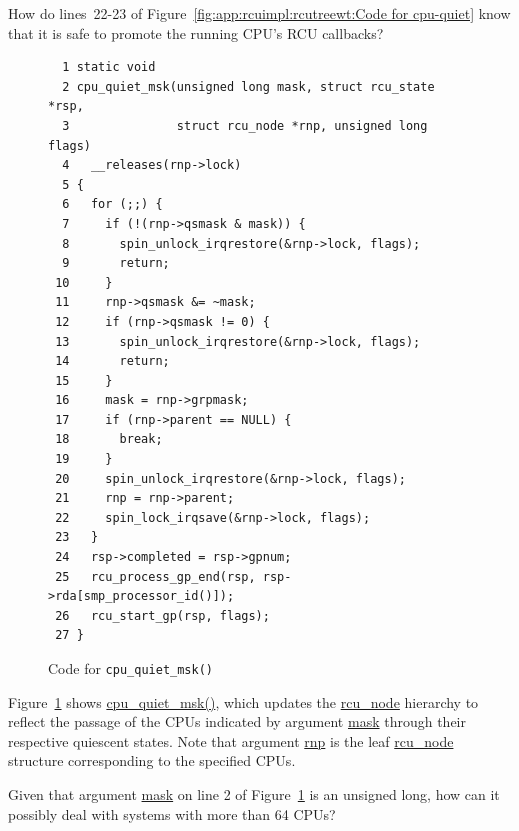\QuickQuiz{}
	How do lines~22-23 of
	Figure~\ref{fig:app:rcuimpl:rcutreewt:Code for cpu-quiet}
	know that it is safe to promote the running CPU's RCU
	callbacks?
 \QuickQuizEnd

\begin{figure}[tbp]
{ \scriptsize
\begin{verbatim}
  1 static void
  2 cpu_quiet_msk(unsigned long mask, struct rcu_state *rsp,
  3               struct rcu_node *rnp, unsigned long flags)
  4   __releases(rnp->lock)
  5 {
  6   for (;;) {
  7     if (!(rnp->qsmask & mask)) {
  8       spin_unlock_irqrestore(&rnp->lock, flags);
  9       return;
 10     }
 11     rnp->qsmask &= ~mask;
 12     if (rnp->qsmask != 0) {
 13       spin_unlock_irqrestore(&rnp->lock, flags);
 14       return;
 15     }
 16     mask = rnp->grpmask;
 17     if (rnp->parent == NULL) {
 18       break;
 19     }
 20     spin_unlock_irqrestore(&rnp->lock, flags);
 21     rnp = rnp->parent;
 22     spin_lock_irqsave(&rnp->lock, flags);
 23   }
 24   rsp->completed = rsp->gpnum;
 25   rcu_process_gp_end(rsp, rsp->rda[smp_processor_id()]);
 26   rcu_start_gp(rsp, flags);
 27 }
\end{verbatim}
}
\caption{Code for {\tt cpu\_quiet\_msk()}}
\label{fig:app:rcuimpl:rcutreewt:Code for cpu-quiet-msk}
\end{figure}

Figure~\ref{fig:app:rcuimpl:rcutreewt:Code for cpu-quiet-msk}
shows \url{cpu_quiet_msk()}, which updates the \url{rcu_node}
hierarchy to reflect the passage of the CPUs indicated by
argument \url{mask} through their respective quiescent states.
Note that argument \url{rnp} is the leaf \url{rcu_node} structure
corresponding to the specified CPUs.

\QuickQuiz{}
	Given that argument \url{mask} on line 2 of
	Figure~\ref{fig:app:rcuimpl:rcutreewt:Code for cpu-quiet-msk}
	is an unsigned long, how can it possibly deal with systems
	with more than 64 CPUs?
 \QuickQuizEnd

